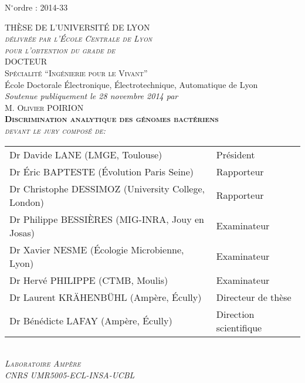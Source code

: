 \documentclass[11pt, a4paper, twoside]{Thesis} %
\renewcommand{\ttitle}{Discrimination analytique des génomes bactériens}
\begin{document}
\begin{titlepage}
\vspace*{-1cm}
\begin{flushright}
 N$^{\circ}$ordre : 2014-33
 \end{flushright}
\begin{center}

\textsc{\LARGE THÈSE DE L'UNIVERSITÉ DE LYON}\\[0.2cm]
\textsc{\Large \textit{délivrée par l'École Centrale de Lyon}}\\[1.5cm] %
\textsc{\textit{pour l'obtention du grade de}}\\[0.4cm] %
\textsc{\Large DOCTEUR}\\[0.4cm] %
\textsc{Spécialité ``Ingénierie pour le Vivant''}\\[0.4cm]
École Doctorale Électronique, Électrotechnique, Automatique de Lyon\\[1cm]
\textit{Soutenue publiquement le 28 novembre 2014 par}\\[1cm]
\textsc{\Large M. Olivier POIRION}\\[1cm]

{\LARGE \bfseries \textsc{\ttitle}}\\[2cm] %
{\textit{\textsc{devant le jury composé de:}}}\\[0.7cm]
\begin{tabular}{ll}
Dr Davide LANE (LMGE, Toulouse) & Président\\
Dr Éric BAPTESTE (Évolution Paris Seine) & Rapporteur\\
Dr Christophe DESSIMOZ (University College, London) & Rapporteur\\
Dr Philippe BESSIÈRES (MIG-INRA, Jouy en Josas) & Examinateur\\
Dr Xavier NESME (Écologie Microbienne, Lyon) & Examinateur\\
Dr Hervé PHILIPPE (CTMB, Moulis) & Examinateur\\
Dr Laurent KRÄHENBÜHL (Ampère, Écully) & Directeur de thèse\\
Dr Bénédicte LAFAY (Ampère, Écully) & Direction scientifique
\end{tabular}
\\[1.5cm]
\textit{\textsc{Laboratoire Ampère\\ CNRS UMR5005-ECL-INSA-UCBL}}
\end{center}

\end{titlepage}
\pagebreak
\pagebreak
\end{document}
